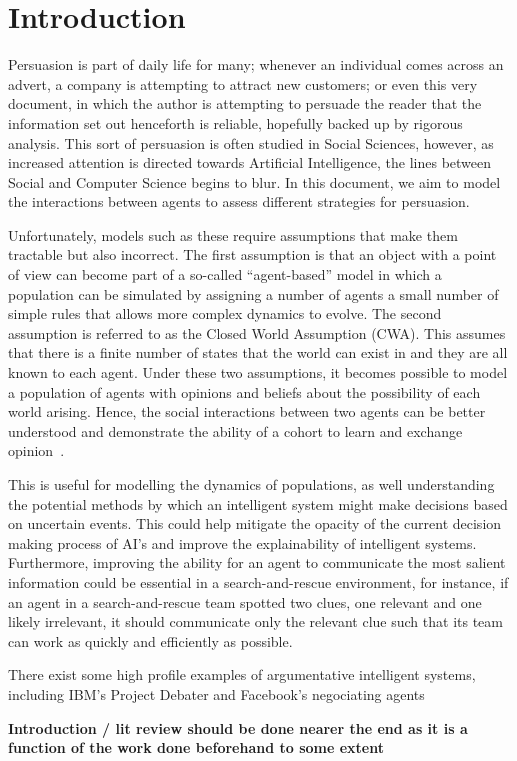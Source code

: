 \newpage

\section{Introduction}

Persuasion is part of daily life for many; whenever an individual comes across an advert, a company is attempting to attract new customers; or even this very document, in which the author is attempting to persuade the reader that the information set out henceforth is reliable, hopefully backed up by rigorous analysis. This sort of persuasion is often studied in Social Sciences, however, as increased attention is directed towards Artificial Intelligence, the lines between Social and Computer Science begins to blur. In this document, we aim to model the interactions between agents to assess different strategies for persuasion. 

Unfortunately, models such as these require assumptions that make them tractable but also incorrect. The first assumption is that an object with a point of view can become part of a so-called ``agent-based'' model in which a population can be simulated by assigning a number of agents a small number of simple rules that allows more complex dynamics to evolve. The second assumption is referred to as the Closed World Assumption (CWA). This assumes that there is a finite number of states that the world can exist in and they are all known to each agent. Under these two assumptions, it becomes possible to model a population of agents with opinions and beliefs about the possibility of each world arising. Hence, the social interactions between two agents can be better understood and demonstrate the ability of a cohort to learn and exchange opinion~\cite{Wooldridge1995IntelligentPractice}. 

This is useful for modelling the dynamics of populations, as well understanding the potential methods by which an intelligent system might make decisions based on uncertain events. This could help mitigate the opacity of the current decision making process of AI's and improve the explainability of intelligent systems. Furthermore, improving the ability for an agent to communicate the most salient information could be essential in a search-and-rescue environment, for instance, if an agent in a search-and-rescue team spotted two clues, one relevant and one likely irrelevant, it should communicate only the relevant clue such that its team can work as quickly and efficiently as possible. 

There exist some high profile examples of argumentative intelligent systems, including IBM's Project Debater and Facebook's negociating agents

\textbf{Introduction / lit review should be done nearer the end as it is a function of the work done beforehand to some extent}

